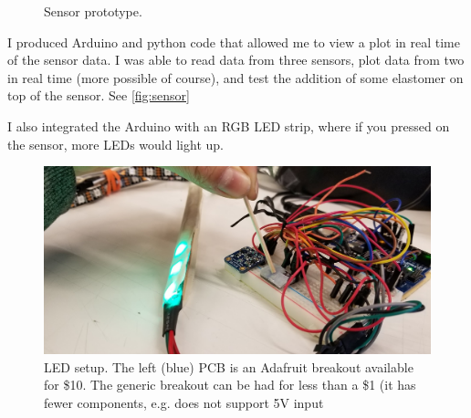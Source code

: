 \documentclass[preprint,12pt,3p]{elsarticle}
\begin{document}
\begin{figure}[htbp]
    \centering 
    \hfil %
        \hfil
        \hfil 
    \caption{Sensor prototype.}
\end{figure}

I produced Arduino and python code that allowed me to view a plot in real time of the sensor data. I
was able to read data from three sensors, plot data from two in real time (more possible of course),
and test the addition of some elastomer on top of the sensor. See \cref{fig:sensor}

I also integrated the Arduino with an RGB LED strip, where if you pressed on the sensor,
more LEDs would light up.

\begin{figure}[H]
\centering
\includegraphics[width=.8\textwidth]{images/sensor/poke.jpg}
\caption{LED setup. The left (blue) PCB is an Adafruit breakout available for
\$10. The generic breakout can be had for less than a \$1 (it has fewer
components, e.g. does not support 5V input}
\end{figure}
\end{document}
